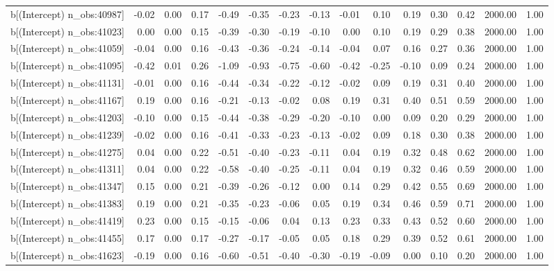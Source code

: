 \begin{table}[ht]
\begin{tabular}{rrrrrrrrrrrrrrr}
  b[(Intercept) n\_obs:40987] & -0.02 & 0.00 & 0.17 & -0.49 & -0.35 & -0.23 & -0.13 & -0.01 & 0.10 & 0.19 & 0.30 & 0.42 & 2000.00 & 1.00 \\ 
  b[(Intercept) n\_obs:41023] & 0.00 & 0.00 & 0.15 & -0.39 & -0.30 & -0.19 & -0.10 & 0.00 & 0.10 & 0.19 & 0.29 & 0.38 & 2000.00 & 1.00 \\ 
  b[(Intercept) n\_obs:41059] & -0.04 & 0.00 & 0.16 & -0.43 & -0.36 & -0.24 & -0.14 & -0.04 & 0.07 & 0.16 & 0.27 & 0.36 & 2000.00 & 1.00 \\ 
  b[(Intercept) n\_obs:41095] & -0.42 & 0.01 & 0.26 & -1.09 & -0.93 & -0.75 & -0.60 & -0.42 & -0.25 & -0.10 & 0.09 & 0.24 & 2000.00 & 1.00 \\ 
  b[(Intercept) n\_obs:41131] & -0.01 & 0.00 & 0.16 & -0.44 & -0.34 & -0.22 & -0.12 & -0.02 & 0.09 & 0.19 & 0.31 & 0.40 & 2000.00 & 1.00 \\ 
  b[(Intercept) n\_obs:41167] & 0.19 & 0.00 & 0.16 & -0.21 & -0.13 & -0.02 & 0.08 & 0.19 & 0.31 & 0.40 & 0.51 & 0.59 & 2000.00 & 1.00 \\ 
  b[(Intercept) n\_obs:41203] & -0.10 & 0.00 & 0.15 & -0.44 & -0.38 & -0.29 & -0.20 & -0.10 & 0.00 & 0.09 & 0.20 & 0.29 & 2000.00 & 1.00 \\ 
  b[(Intercept) n\_obs:41239] & -0.02 & 0.00 & 0.16 & -0.41 & -0.33 & -0.23 & -0.13 & -0.02 & 0.09 & 0.18 & 0.30 & 0.38 & 2000.00 & 1.00 \\ 
  b[(Intercept) n\_obs:41275] & 0.04 & 0.00 & 0.22 & -0.51 & -0.40 & -0.23 & -0.11 & 0.04 & 0.19 & 0.32 & 0.48 & 0.62 & 2000.00 & 1.00 \\ 
  b[(Intercept) n\_obs:41311] & 0.04 & 0.00 & 0.22 & -0.58 & -0.40 & -0.25 & -0.11 & 0.04 & 0.19 & 0.32 & 0.46 & 0.59 & 2000.00 & 1.00 \\ 
  b[(Intercept) n\_obs:41347] & 0.15 & 0.00 & 0.21 & -0.39 & -0.26 & -0.12 & 0.00 & 0.14 & 0.29 & 0.42 & 0.55 & 0.69 & 2000.00 & 1.00 \\ 
  b[(Intercept) n\_obs:41383] & 0.19 & 0.00 & 0.21 & -0.35 & -0.23 & -0.06 & 0.05 & 0.19 & 0.34 & 0.46 & 0.59 & 0.71 & 2000.00 & 1.00 \\ 
  b[(Intercept) n\_obs:41419] & 0.23 & 0.00 & 0.15 & -0.15 & -0.06 & 0.04 & 0.13 & 0.23 & 0.33 & 0.43 & 0.52 & 0.60 & 2000.00 & 1.00 \\ 
  b[(Intercept) n\_obs:41455] & 0.17 & 0.00 & 0.17 & -0.27 & -0.17 & -0.05 & 0.05 & 0.18 & 0.29 & 0.39 & 0.52 & 0.61 & 2000.00 & 1.00 \\ 
  b[(Intercept) n\_obs:41623] & -0.19 & 0.00 & 0.16 & -0.60 & -0.51 & -0.40 & -0.30 & -0.19 & -0.09 & 0.00 & 0.10 & 0.20 & 2000.00 & 1.00 \\ 

\end{tabular}
\end{table}

